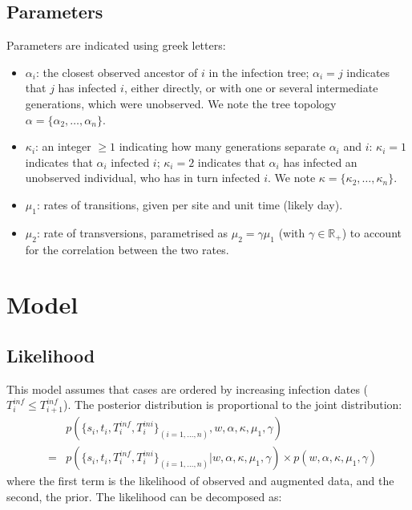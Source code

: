 \documentclass[10pt]{article}
\begin{document}
\subsection*{Parameters}
Parameters are indicated using greek letters:
\begin{itemize}
         \item $\alpha_i$: the closest observed ancestor of $i$ in the infection tree; $\alpha_i=j$ indicates that $j$ has infected $i$, either directly, or with one or several intermediate generations, which were unobserved. 
We note the tree topology $\alpha = \{\alpha_2, \ldots, \alpha_n\}$.
 	\item $\kappa_i$: an integer $\geq 1$ indicating how many generations separate $\alpha_i$ and $i$: $\kappa_i=1$ indicates that $\alpha_i$ infected $i$; $\kappa_i=2$ indicates that $\alpha_i$ has infected an unobserved individual, who has in turn infected $i$.
We note $\kappa = \{\kappa_2, \ldots, \kappa_n\}$.

	\item $\mu_1$: rates of transitions, given per site and unit time (likely day).
	\item $\mu_2 $: rate of transversions, parametrised as $\mu_2 = \gamma \mu_1$ (with $\gamma \in \mathbb{R}_+$) to account for the correlation between the two rates.
\end{itemize}






\section*{Model}

\subsection*{Likelihood}

This model assumes that cases are ordered by increasing infection dates ($T_i^{inf} \leq T_{i+1}^{inf}$).
The posterior distribution is proportional to the joint distribution:
\begin{eqnarray}
& & p(\{s_i, t_i, T_i^{inf},T_i^{ini}\}_{(i=1,\ldots,n)}, w, \alpha, \kappa, \mu_1, \gamma)\\
& = & p(\{s_i, t_i, T_i^{inf},T_i^{ini}\}_{(i=1,\ldots,n)}| w, \alpha, \kappa, \mu_1, \gamma) \times p( w, \alpha, \kappa, \mu_1, \gamma)
\end{eqnarray}
where the first term is the likelihood of observed and augmented data, and the second, the prior.
The likelihood can be decomposed as:
\end{document}

